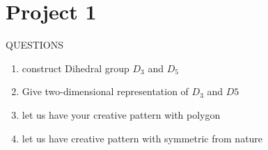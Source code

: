 \documentclass{article}
\begin{document}
\newcommand{\drawGraph}[1]{
\draw[step=1cm,gray,very thin] (-3,-3) grid (2,3);
\foreach \x in {-2,-1,0,1,2}
   \draw (\x cm,1pt) -- (\x cm,-1pt) node[anchor=north] {$\x$};
\foreach \y in {-2,-1,0,1,2}
    \draw (1pt,\y cm) -- (-1pt,\y cm) node[anchor=east] {$\y$};  
}

\newcommand{\drawGraphNo}[1]{
\draw [color=black](-3,0) -- (3,0);
\draw [color=black](0,-2) -- (0,3);
}
\newcommand{\labelForthree}[3]{
\tikzstyle{every node}=[draw];
\node[top color=white] (v1) at (0:1.3){$#2$} ;
\node[top color=white] (v2) at (90:2) {$#3$};
\node[top color=white] (v3) at (2*90:1.2) {$#1$};
}

\newcommand{\drawTriangle}[3]{
\begin{tikzpicture}
    \drawGraphNo{3}
    \node[regular polygon,
    draw,minimum size=2cm,
    right color=white,left color=white,
    regular polygon sides = 3] (p) at (0,0.5){};
   \labelForthree{#1}{#2}{#3}
\end{tikzpicture}
}

\newcommand{\drawTrianglel}[7]{
\begin{tikzpicture}
    \drawGraphNo{3}
    \node[regular polygon,
    draw,minimum size=2cm,
    right color=white,left color=white,
    regular polygon sides = 3] (p) at (0,0.5){};
    \draw [dashed,color=black](#4,#5) -- (#6,#7);
   \labelForthree{#1}{#2}{#3}
\end{tikzpicture}
}

\section{\Large{Project 1}}

\large{QUESTIONS}
\begin{enumerate}
    \item construct Dihedral group $D_3$ and $D_5$
    \item Give two-dimensional representation of $D_3$ and $D5$
    \item let us have your creative pattern with polygon
    \item let us have  creative pattern with symmetric from nature
\end{enumerate}
\newcommand{\ArrowName}[1]{
\begin{tikzpicture}
    \draw [color=white](0,-3) -- (0,3);
    \draw [color=white](-2,0) -- (2,0);
    \draw[ultra thick, ->](-1,0) -- (1,0);
    \node at (0,0.3) {$#1$};
\end{tikzpicture}
}
\end{document}
